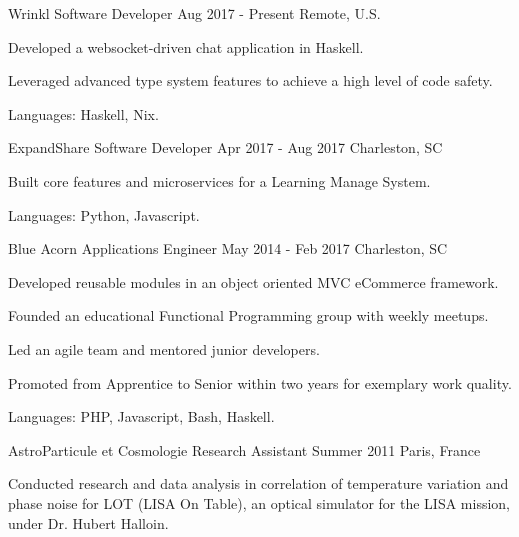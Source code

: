 

\begin{cventries}

  \cventry
    {Wrinkl}
    {Software Developer}
    {Aug 2017 - Present}
    {Remote, U.S.}
    {
      \begin{cvitems}
        \item {Developed a websocket-driven chat application in Haskell.}
        \item {Leveraged advanced type system features to achieve a high level of code safety.}
        \item {Languages: Haskell, Nix.}
      \end{cvitems}
    }

  \cventry
    {ExpandShare}
    {Software Developer}
    {Apr 2017 - Aug 2017}
    {Charleston, SC}
    {
      \begin{cvitems}
        \item {Built core features and microservices for a Learning Manage System.}
        \item {Languages: Python, Javascript.}
      \end{cvitems}
    }

  \cventry
    {Blue Acorn} %
    {Applications Engineer} %
    {May 2014 - Feb 2017} %
    {Charleston, SC} %
    {
      \begin{cvitems} %
        \item {Developed reusable modules in an object oriented MVC eCommerce framework.}
        \item {Founded an educational Functional Programming group with weekly meetups.}
        \item {Led an agile team and mentored junior developers.}
        \item {Promoted from Apprentice to Senior within two years for exemplary work quality.}
        \item {Languages: PHP, Javascript, Bash, Haskell.}
      \end{cvitems}
    }

  \cventry
    {AstroParticule et Cosmologie}
    {Research Assistant}
    {Summer 2011}
    {Paris, France}
    {
      \begin{cvitems}
        \item {Conducted research and data analysis in correlation of temperature variation and phase noise for LOT (LISA On Table), an optical simulator for the LISA mission, under Dr. Hubert Halloin.}
      \end{cvitems}
    }

\end{cventries}
